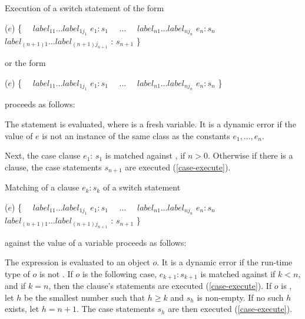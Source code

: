 \documentclass[makeidx]{article}
\begin{document}
{

\LMHash{}%
Execution of a switch statement of the form

\begin{normativeDartCode}
\SWITCH{} ($e$) \{
\ \ $label_{11} \ldots label_{1j_1}$ \CASE{} $e_1: s_1$
\ \ $\ldots$
\ \ $label_{n1} \ldots label_{nj_n}$ \CASE{} $e_n: s_n$
\ \ $label_{(n+1)1} \ldots label_{(n+1)j_{n+1}}$ \DEFAULT{}: $s_{n+1}$
\}
\end{normativeDartCode}

or the form

\begin{normativeDartCode}
\SWITCH{} ($e$) \{
\ \ $label_{11} \ldots label_{1j_1}$ \CASE{} $e_1: s_1$
\ \ $\ldots$
\ \ $label_{n1} \ldots label_{nj_n}$ \CASE{} $e_n: s_n$
\}
\end{normativeDartCode}

proceeds as follows:

\LMHash{}%
The statement  is evaluated, where \id{} is a fresh variable.
It is a dynamic error if the value of $e$ is
not an instance of the same class as the constants $e_1, \ldots, e_n$.


\LMHash{}%
Next, the case clause \CASE{} $e_{1}$: $s_{1}$ is matched against \id, if $n > 0$.
Otherwise if there is a \DEFAULT{} clause, the case statements $s_{n+1}$ are executed (\ref{case-execute}).

\LMHash{}%
Matching of a \CASE{} clause \CASE{} $e_{k}: s_{k}$ of a switch statement

\begin{normativeDartCode}
\SWITCH{} ($e$) \{
\ \ $label_{11} \ldots label_{1j_1}$ \CASE{} $e_1: s_1$
\ \ $\ldots$
\ \ $label_{n1} \ldots label_{nj_n}$ \CASE{} $e_n: s_n$
\ \ $label_{(n+1)1} \ldots label_{(n+1)j_{n+1}}$ \DEFAULT{}: $s_{n+1}$
\}
\end{normativeDartCode}

against the value of a variable \id{} proceeds as follows:

\LMHash{}%
The expression  is evaluated to an object $o$.
It is a dynamic error if the run-time type of $o$ is not .
If $o$ is \FALSE{} the following case, \CASE{} $e_{k+1}: s_{k+1}$ is matched against \id{} if $k < n$, and if $k = n$, then the \DEFAULT{} clause's statements are executed (\ref{case-execute}).
If $o$ is \TRUE{}, let $h$ be the smallest number such that $h \ge k$ and $s_h$ is non-empty.
If no such $h$ exists, let $h = n + 1$.
The case statements $s_h$ are then executed (\ref{case-execute}).

}
\end{document}
